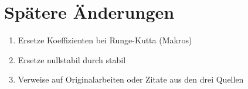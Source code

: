 
\chapter{Spätere Änderungen}

\begin{enumerate}
\item Ersetze Koeffizienten bei Runge-Kutta (Makros)
\item Ersetze \glqq nullstabil\grqq{} durch \glqq stabil\grqq{}
\item Verweise auf Originalarbeiten oder Zitate aus den drei Quellen 
\end{enumerate}

